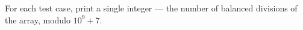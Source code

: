 For each test case, print a single integer --- the number of balanced divisions of the array, modulo $10^9 + 7$.
